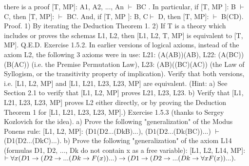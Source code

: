 there is a proof [T, MP]: A1, A2, ..., An \(\vdash\) B\IMPLIES C .
In particular, if [T, MP ]: B \(\vdash\) C, then [T, MP]: \(\vdash\) B\IMPLIES C.
And, if [T, MP ]: B, C\(\vdash\) D, then [T, MP]: \(\vdash\) B\IMPLIES (C\IMPLIES D).
Proof. 1) By iterating the Deduction Theorem 1.
2) If T is a theory which includes or proves the schemas L1, L2, then [L1, L2, T, MP] is equivalent to [T,
MP]. Q.E.D.
Exercise 1.5.2. In earlier versions of logical axioms, instead of the axiom L2, the following 3 axioms
were in use:
L21: (A\IMPLIES (A\IMPLIES B))\IMPLIES (A\IMPLIES B),
L22: (A\IMPLIES (B\IMPLIES C))\IMPLIES (B\IMPLIES (A\IMPLIES C)) (i.e. the Premise Permutation Law),
L23: (A\IMPLIES B)\IMPLIES ((B\IMPLIES C)\IMPLIES (A\IMPLIES C)) (the Law of Syllogism, or the transitivity property of implication).
Verify that both versions, i.e. [L1, L2, MP] and [L1, L21, L23, L23, MP] are equivalent. (Hint: a) See
Section 2.1 to verify that [L1, L2, MP] proves L21, L23, L23. b) Verify that [L1, L21, L23, L23, MP] proves
L2 either directly, or by proving the Deduction Theorem 1 for [L1, L21, L23, L23, MP].)
Exercise 1.5.3 (thanks to Sergey Kozlovich for the idea).
a) Prove the following "generalization" of the Modus Ponens rule:
[L1, L2, MP]: (D1\IMPLIES (D2\IMPLIES ...(Dk\IMPLIES B)...), (D1\IMPLIES (D2\IMPLIES ...(Dk\IMPLIES (B\IMPLIES C))...) \(\vdash\) (D1\IMPLIES (D2\IMPLIES ...(Dk\IMPLIES C)...).
b) Prove the following "generalization" of the axiom L14 (formulas D1, D2, ..., Dk do not contain x as a
free variable):
[L1, L2, L14, MP]: \(\vdash \forall x(D1\rightarrow (D2\rightarrow ...(Dk\rightarrow F(x))...) \rightarrow  (D1\rightarrow (D2\rightarrow ...(Dk\rightarrow \forall xF(x))...).\)

